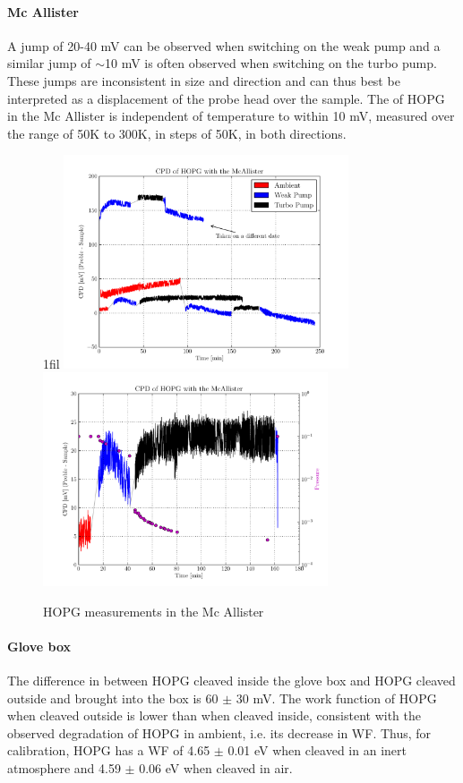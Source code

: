 \documentclass[a4paper,10pt]{article}
\makeatletter
\newcommand{\cpd}{\text{CPD}}
\newcommand{\McA}{Mc Allister}
\newcommand{\hopg}{HOPG}
\newcommand{\ie}{i.e.}
\newcommand{\wf}{WF}
\newcommand*{\centerfloat}{%
  \parindent \z@
  \leftskip \z@ \@plus 1fil \@minus \textwidth
  \rightskip\leftskip
  \parfillskip \z@skip}
\makeatother
\begin{document}
\paragraph{\McA{}}
A jump of 20-40 mV can be observed when switching on the weak pump and a similar jump of $\sim$10 mV is often observed when switching on the turbo pump. These jumps are inconsistent in size and direction and can thus best be interpreted as a displacement of the probe head over the sample. The \cpd{} of \hopg{} in the \McA{} is independent of temperature to within 10 mV, measured over the range of 50K to 300K, in steps of 50K, in both directions.
\begin{figure}[h]
\centerfloat
	\includegraphics[width=0.75\textwidth]{HOPGMcA}
		\hspace{-0.08\textwidth}
	\includegraphics[width=0.75\textwidth]{HOPGMcAPres}
	\caption{\hopg{} measurements in the \McA{}}
		\label{fig:hopgmca}
\end{figure}
\paragraph{Glove box}
The difference in \cpd{} between \hopg{} cleaved inside the glove box and \hopg{} cleaved outside and brought into the box is 60 $\pm$ 30 mV. The work function of \hopg{} when cleaved outside is lower than when cleaved inside, consistent with the observed degradation of \hopg{} in ambient, \ie{} its decrease in \wf{}. Thus, for calibration, \hopg{} has a \wf{} of 4.65 $\pm$ 0.01 eV when cleaved in an inert atmosphere and 4.59 $\pm$ 0.06 eV when cleaved in air.\\
\end{document}
